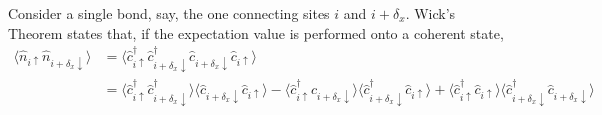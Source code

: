 Consider a single bond, say, the one connecting sites $i$ and $i+\delta_x$. Wick's Theorem states that, if the expectation value is performed onto a coherent state,
\[
\begin{aligned}
	\langle 
		\hat n_{i\uparrow} \hat n_{i + \delta_x \downarrow}
	\rangle &= \langle 
		\hat c_{i\uparrow}^\dagger \hat c_{i + \delta_x \downarrow}^\dagger \hat c_{i + \delta_x \downarrow} \hat c_{i\uparrow} 
	\rangle \\
	&= \langle 
		\hat c_{i\uparrow}^\dagger \hat c_{i + \delta_x \downarrow}^\dagger
	\rangle \langle	
		\hat c_{i + \delta_x \downarrow} \hat c_{i\uparrow} 
	\rangle - \langle 
		\hat c_{i\uparrow}^\dagger \hat c_{i + \delta_x \downarrow}
	\rangle \langle	
		\hat c_{i + \delta_x \downarrow}^\dagger \hat c_{i\uparrow} 
	\rangle + \langle 
		\hat c_{i\uparrow}^\dagger \hat c_{i\uparrow}
	\rangle \langle	
		\hat c_{i + \delta_x \downarrow}^\dagger \hat c_{i + \delta_x \downarrow} 
	\rangle
\end{aligned}
\]
\todo